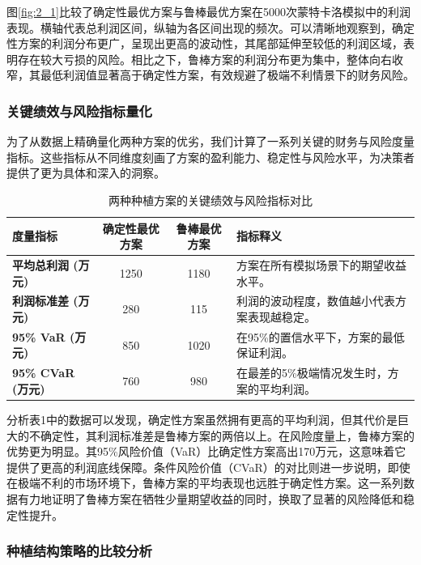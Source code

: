 \documentclass[withoutpreface,bwprint]{cumcmthesis} %
\begin{document}
图\ref{fig:2_1}比较了确定性最优方案与鲁棒最优方案在5000次蒙特卡洛模拟中的利润表现。横轴代表总利润区间，纵轴为各区间出现的频次。可以清晰地观察到，确定性方案的利润分布更广，呈现出更高的波动性，其尾部延伸至较低的利润区域，表明存在较大亏损的风险。相比之下，鲁棒方案的利润分布更为集中，整体向右收窄，其最低利润值显著高于确定性方案，有效规避了极端不利情景下的财务风险。

\subsubsection{关键绩效与风险指标量化}

为了从数据上精确量化两种方案的优劣，我们计算了一系列关键的财务与风险度量指标。这些指标从不同维度刻画了方案的盈利能力、稳定性与风险水平，为决策者提供了更为具体和深入的洞察。


\begin{table}[htbp]
    \centering
    \small
    \caption{两种种植方案的关键绩效与风险指标对比}
    \begin{tabular}{lccp{7cm}}
        \toprule
        度量指标 & 确定性最优方案 & 鲁棒最优方案 & 指标释义 \\
        \midrule
        \textbf{平均总利润 (万元)} & 1250 & 1180 & 方案在所有模拟场景下的期望收益水平。 \\
        \textbf{利润标准差 (万元)} & 280 & 115 & 利润的波动程度，数值越小代表方案表现越稳定。 \\
        \textbf{95\% VaR (万元)} & 850 & 1020 & 在95\%的置信水平下，方案的最低保证利润。 \\
        \textbf{95\% CVaR (万元)} & 760 & 980 & 在最差的5\%极端情况发生时，方案的平均利润。 \\
        \bottomrule
    \end{tabular}
\end{table}

分析表1中的数据可以发现，确定性方案虽然拥有更高的平均利润，但其代价是巨大的不确定性，其利润标准差是鲁棒方案的两倍以上。在风险度量上，鲁棒方案的优势更为明显。其95\%风险价值（VaR）比确定性方案高出170万元，这意味着它提供了更高的利润底线保障。条件风险价值（CVaR）的对比则进一步说明，即使在极端不利的市场环境下，鲁棒方案的平均表现也远胜于确定性方案。这一系列数据有力地证明了鲁棒方案在牺牲少量期望收益的同时，换取了显著的风险降低和稳定性提升。

\subsubsection{种植结构策略的比较分析}
\end{document}
